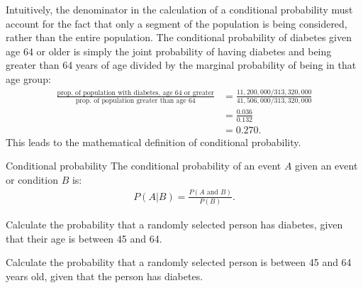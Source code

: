 Intuitively, the denominator in the calculation of a conditional probability must account for the fact that only a segment of the population is being considered, rather than the entire population. The conditional probability of diabetes given age 64 or older is simply the joint probability of having diabetes and being greater than 64 years of age divided by the marginal probability of being in that age group:
\begin{align*}
\frac{\text{prop. of population with diabetes, age 64 or greater}}{\text{prop. of population greater than age 64}} &= \frac{11,200,000/313,320,000}{41,506,000/313,320,000}\\
&= \frac{0.036}{0.132} \\
&= 0.270.
\end{align*}
This leads to the mathematical definition of conditional probability.

\begin{onebox}{Conditional probability}
The conditional probability of an event $A$ given an event or condition $B$ is:
\begin{align}
P(A | B) = \frac{P(A\text{ and }B)}{P(B)}.
\label{condProbEq}
\end{align}
\end{onebox}

\begin{exercisewrap}
\begin{nexercise}
Calculate the probability that a randomly selected person has diabetes, given that their age is between 45 and 64.\footnotemark{}
\end{nexercise}
\end{exercisewrap}
\textD{\vspace{-2mm}}

\textD{\newpage}

\begin{exercisewrap}
\begin{nexercise}
Calculate the probability that a randomly selected person is between 45 and 64 years old, given that the person has diabetes.\footnotemark{}
\end{nexercise}
\end{exercisewrap}
\textD{\vspace{-2mm}}

